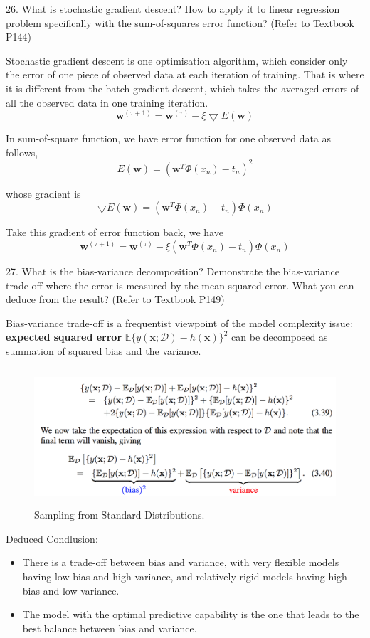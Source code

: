 \documentclass[11pt,a4paper]{article}
\newcommand{\bs}[1]{\boldsymbol{#1}}
\begin{document}
    26. What is stochastic gradient descent? How to apply it to linear regression problem specifically with the sum-of-squares error function? (Refer to Textbook P144)

    Stochastic gradient descent is one optimisation algorithm, which consider only the error of one piece of observed data at each iteration of training. That is where it is different from the batch gradient descent, which takes the averaged errors of all the observed data in one training iteration.
    $$ \bs{w}^{(\tau+1)} = \bs{w}^{(\tau)} - \xi \bigtriangledown E(\bs{w}) $$

    In sum-of-square function, we have error function for one observed data as follows,
    $$ E(\bs{w}) = ( \bs{w}^T \Phi(x_n) - t_n)^2 $$
    
    whose gradient is 
    $$ \bigtriangledown E(\bs{w}) = (\bs{w}^T \Phi(x_n) - t_n) \Phi(x_n)$$
    
    Take this gradient of error function back, we have
    $$ \bs{w}^{(\tau+1)} = \bs{w}^{(\tau)} - \xi (\bs{w}^T \Phi(x_n) - t_n) \Phi(x_n) $$

27. What is the bias-variance decomposition? Demonstrate the bias-variance trade-off where the error is measured by the mean squared error. What you can deduce from the result? (Refer to Textbook P149)
    
Bias-variance trade-off is a frequentist viewpoint of the model complexity issue: \textbf{expected squared error} $\mathbb{E}\{ y(\bs{x} ; \mathcal{D}) - h(\bs{x}) \}^2$ can be decomposed as summation of squared bias and the variance.

\begin{figure}[H] \centering
    \includegraphics[width=5.5in,height=2in]{./figure/BVtradeoff.png}
    \caption{Sampling from Standard Distributions.}
\end{figure}

Deduced Condlusion: 

\begin{itemize}
    \item There is a trade-off between bias and variance, with very flexible models having low bias and high variance, and relatively rigid models having high bias and low variance.
    \item The model with the optimal predictive capability is the one that leads to the best balance between bias and variance. 
\end{itemize}
\end{document}
